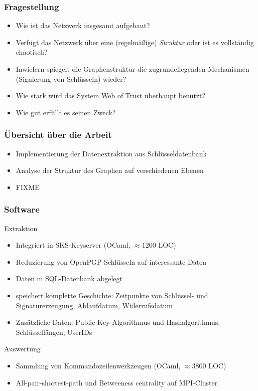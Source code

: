 \documentclass[10pt]{beamer}
\begin{document}
\begin{frame}
  \frametitle{Fragestellung}
  \begin{itemize}
  \item Wie ist das Netzwerk insgesamt aufgebaut?
  \item Verf\"ugt das Netzwerk \"uber eine (regelm\"a{\ss}ige)
    \emph{Struktur} oder ist es vollst\"andig chaotisch?
  \item Inwiefern spiegelt die Graphenstruktur die zugrundeliegenden
    Mechanismen (Signierung von Schl\"usseln) wieder?
  \item Wie stark wird das System Web of Trust \"uberhaupt benutzt?
  \item Wie gut erf\"ullt es seinen Zweck?
  \end{itemize}
\end{frame}

\begin{frame}
  \frametitle{\"Ubersicht \"uber die Arbeit}
  \begin{itemize}
  \item Implementierung der Datenextraktion aus Schl\"usseldatenbank
  \item Analyse der Struktur des Graphen auf verschiedenen Ebenen
  \item FIXME
  \end{itemize}
\end{frame}

\begin{frame}
  \frametitle{Software}
  Extraktion
  \begin{itemize}
  \item Integriert in SKS-Keyserver (OCaml, $\approx 1200$ LOC)
  \item Reduzierung von OpenPGP-Schl\"usseln auf interessante Daten
  \item Daten in SQL-Datenbank abgelegt
  \item speichert komplette Geschichte: Zeitpunkte von Schl\"ussel-
    und Signaturerzeugung, Ablaufdatum, Widerrufsdatum
  \item Zus\"atzliche Daten: Public-Key-Algorithmus und
    Hashalgorithmus, Schl\"ussell\"angen, UserIDs
  \end{itemize}

Auswertung
\begin{itemize}
\item Sammlung von Kommandozeilenwerkzeugen (OCaml, $\approx 3800$
  LOC)
\item All-pair-shortest-path und Betweeness centrality auf MPI-Cluster
\end{itemize}
\end{frame}
\end{document}
